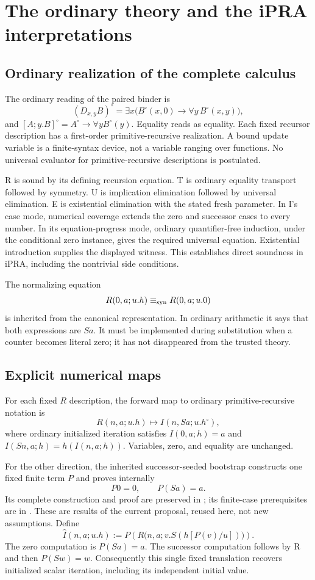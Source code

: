 \section{The ordinary theory and the iPRA interpretations}
\label{sec:interpretations}

\subsection{Ordinary realization of the complete calculus}
The ordinary reading of the paired binder is
\[
 (D_{x,y}B)^\circ
 =\exists x\bigl(B^\circ(x,0)\to\forall y\,B^\circ(x,y)\bigr),
\]
and $[A;y.B]^\circ=A^\circ\to\forall yB^\circ(y)$. Equality reads as equality. Each fixed recursor description has a first-order primitive-recursive realization. A bound update variable is a finite-syntax device, not a variable ranging over functions. No universal evaluator for primitive-recursive descriptions is postulated.

R is sound by its defining recursion equation. T is ordinary equality transport followed by symmetry. U is implication elimination followed by universal elimination. E is existential elimination with the stated fresh parameter. In I's case mode, numerical coverage extends the zero and successor cases to every number. In its equation-progress mode, ordinary quantifier-free induction, under the conditional zero instance, gives the required universal equation. Existential introduction supplies the displayed witness. This establishes direct soundness in iPRA, including the nontrivial side conditions.

The normalizing equation
\[
 R(0,a;u.h)\mathrel{\equiv_{\mathrm{syn}}} R(0,a;u.0)
\]
is inherited from the canonical representation. In ordinary arithmetic it says that both expressions are $Sa$. It must be implemented during substitution when a counter becomes literal zero; it has not disappeared from the trusted theory.

\subsection{Explicit numerical maps}
For each fixed $R$ description, the forward map to ordinary primitive-recursive notation is
\[
 R(n,a;u.h)\longmapsto I(n,Sa;u.h^\circ),
\]
where ordinary initialized iteration satisfies $I(0,a;h)=a$ and $I(Sn,a;h)=h(I(n,a;h))$. Variables, zero, and equality are unchanged.

For the other direction, the inherited successor-seeded bootstrap constructs one fixed finite term $P$ and proves internally
\[
 P0=0,\qquad P(Sa)=a.
\]
Its complete construction and proof are preserved in ; its finite-case prerequisites are in . These are results of the current proposal, reused here, not new assumptions. Define
\[
 \widehat I(n,a;u.h)
 :=P\!\left(R\bigl(n,a;v.S(h[P(v)/u])\bigr)\right).
\]
The zero computation is $P(Sa)=a$. The successor computation follows by R and then $P(Sw)=w$. Consequently this single fixed translation recovers initialized scalar iteration, including its independent initial value.

